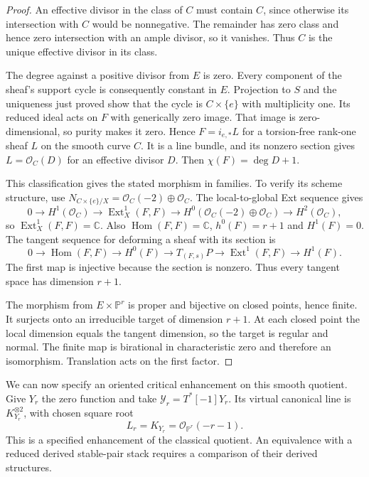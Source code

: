 \begin{proof}
An effective divisor in the class of $C$ must contain $C$,
since otherwise its intersection with $C$ would be nonnegative.
The remainder has zero class and hence zero intersection with
an ample divisor, so it vanishes. Thus $C$ is the unique
effective divisor in its class.

The degree against a positive divisor from $E$ is zero.
Every component of the sheaf's support cycle is consequently
constant in $E$. Projection to $S$ and the uniqueness just
proved show that the cycle is $C\times\{e\}$ with multiplicity
one. Its reduced ideal acts on $F$ with generically zero image.
That image is zero-dimensional, so purity makes it zero.
Hence $F=i_{e,*}L$ for a torsion-free rank-one sheaf $L$ on
the smooth curve $C$. It is a line bundle, and its nonzero
section gives $L=\mathcal O_C(D)$ for an effective divisor $D$.
Then $\chi(F)=\deg D+1$.

This classification gives the stated morphism in families.
To verify its scheme structure, use
$N_{C\times\{e\}/X}=\mathcal O_C(-2)\oplus\mathcal O_C$.
The local-to-global Ext sequence gives
\[
 0\to H^1(\mathcal O_C)\to\operatorname{Ext}^1_X(F,F)
 \to H^0(\mathcal O_C(-2)\oplus\mathcal O_C)
 \to H^2(\mathcal O_C),
\]
so $\operatorname{Ext}^1_X(F,F)=\mathbb C$.
Also $\operatorname{Hom}(F,F)=\mathbb C$,
$h^0(F)=r+1$ and $H^1(F)=0$. The tangent sequence for
deforming a sheaf with its section is
\[
 0\to\operatorname{Hom}(F,F)\to H^0(F)
 \to T_{(F,s)}P\to\operatorname{Ext}^1(F,F)\to H^1(F).
\]
The first map is injective because the section is nonzero.
Thus every tangent space has dimension $r+1$.

The morphism from $E\times\mathbb P^r$ is proper and
bijective on closed points, hence finite. It surjects onto
an irreducible target of dimension $r+1$. At each closed
point the local dimension equals the tangent dimension,
so the target is regular and normal. The finite map is
birational in characteristic zero and therefore an
isomorphism. Translation acts on the first factor.
\end{proof}

We can now specify an oriented critical enhancement on this
smooth quotient. Give $Y_r$ the zero function and take
$\mathcal Y_r=T^*[-1]Y_r$. Its virtual canonical line is
$K_{Y_r}^{\otimes2}$, with chosen square root
\begin{equation}\label{cycompact:eq:rational-orientation}
 L_r=K_{Y_r}=\mathcal O_{\mathbb P^r}(-r-1).
\end{equation}
This is a specified enhancement of the classical quotient.
An equivalence with a reduced derived stable-pair stack
requires a comparison of their derived structures.

